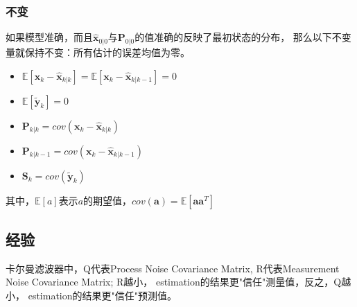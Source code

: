 \subsubsection{不变}
如果模型准确，而且$\hat{\bm{x}}_{0|0}$与$\bm{P}_{0|0}$的值准确的反映了最初状态的分布，
那么以下不变量就保持不变：所有估计的误差均值为零。
\begin{itemize}
  \item $\mathbb{E}[\bm{x}_k - \hat{\bm{x}}_{k|k}] =
      \mathbb{E}[\bm{x}_k - \hat{\bm{x}}_{k|k-1}] = 0$
  \item  $\mathbb{E}[\tilde{\bm{y}}_k]=0$
  \item $\bm{P}_{k|k}= cov(\bm{x}_k - \hat{\bm{x}}_{k|k})$
  \item $\bm{P}_{k|k-1}= cov(\bm{x}_k - \hat{\bm{x}}_{k|k-1})$
  \item $\bm{S}_k = cov(\tilde{\bm{y}}_k)$
\end{itemize}
其中，$\mathbb{E}[a]$表示$a$的期望值，$cov(\bm{a})=\mathbb{E}[\bm{a} \bm{a}^T]$

\subsection{经验}
卡尔曼滤波器中，Q代表Process Noise Covariance Matrix, R代表Measurement Noise
Covariance Matrix; R越小， estimation的结果更"信任"测量值，反之，Q越小，
estimation的结果更"信任"预测值。

